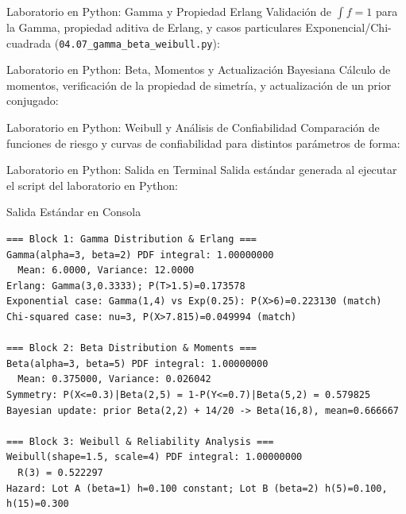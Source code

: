 \documentclass[10pt, aspectratio=169]{beamer}
\begin{document}
\begin{frame}[fragile]{Laboratorio en Python: Gamma y Propiedad Erlang}
  \scriptsize
  Validación de $\int f = 1$ para la Gamma, propiedad aditiva de Erlang, y casos particulares Exponencial/Chi-cuadrada (\texttt{04.07\_gamma\_beta\_weibull.py}):
  {
  }
\end{frame}

\begin{frame}[fragile]{Laboratorio en Python: Beta, Momentos y Actualización Bayesiana}
  \scriptsize
  Cálculo de momentos, verificación de la propiedad de simetría, y actualización de un prior conjugado:
  \vspace{0.02cm}
  {
  }
\end{frame}

\begin{frame}[fragile]{Laboratorio en Python: Weibull y Análisis de Confiabilidad}
  \scriptsize
  Comparación de funciones de riesgo y curvas de confiabilidad para distintos parámetros de forma:
  \vspace{0.02cm}
  {
  }
\end{frame}

\begin{frame}[fragile]{Laboratorio en Python: Salida en Terminal}
  \scriptsize
  Salida estándar generada al ejecutar el script del laboratorio en Python:
  \vspace{0.02cm}
  \begin{block}{Salida Estándar en Consola}
    \fontsize{4pt}{5pt}\selectfont
    \begin{verbatim}
=== Block 1: Gamma Distribution & Erlang ===
Gamma(alpha=3, beta=2) PDF integral: 1.00000000
  Mean: 6.0000, Variance: 12.0000
Erlang: Gamma(3,0.3333); P(T>1.5)=0.173578
Exponential case: Gamma(1,4) vs Exp(0.25): P(X>6)=0.223130 (match)
Chi-squared case: nu=3, P(X>7.815)=0.049994 (match)

=== Block 2: Beta Distribution & Moments ===
Beta(alpha=3, beta=5) PDF integral: 1.00000000
  Mean: 0.375000, Variance: 0.026042
Symmetry: P(X<=0.3)|Beta(2,5) = 1-P(Y<=0.7)|Beta(5,2) = 0.579825
Bayesian update: prior Beta(2,2) + 14/20 -> Beta(16,8), mean=0.666667

=== Block 3: Weibull & Reliability Analysis ===
Weibull(shape=1.5, scale=4) PDF integral: 1.00000000
  R(3) = 0.522297
Hazard: Lot A (beta=1) h=0.100 constant; Lot B (beta=2) h(5)=0.100, h(15)=0.300
    \end{verbatim}
  \end{block}
\end{frame}
\end{document}
